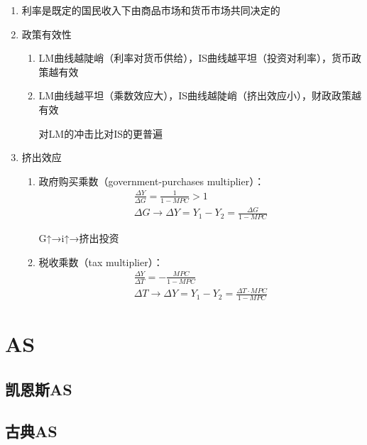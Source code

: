 \documentclass[12pt]{book}
\begin{document}
\begin{enumerate}[1.]
    \item 利率是既定的国民收入下由商品市场和货币市场共同决定的
    \item 政策有效性
          \begin{enumerate}[(1)]
              \item LM曲线越陡峭（利率对货币供给），IS曲线越平坦（投资对利率），货币政策越有效
              \item LM曲线越平坦（乘数效应大），IS曲线越陡峭（挤出效应小），财政政策越有效
                    \par 对LM的冲击比对IS的更普遍
          \end{enumerate}
    \item 挤出效应
          \begin{enumerate}[(1)]
              \item 政府购买乘数（government-purchases multiplier）：
                    \begin{gather*}
                        \frac{\Delta Y}{\Delta G}=\frac{1}{1-MPC}>1 \\
                        \Delta G\rightarrow \Delta Y=Y_1-Y_2=\frac{\Delta G}{1-MPC}
                    \end{gather*}
                    \par G↑→i↑→挤出投资
              \item 税收乘数（tax multiplier）：
                    \begin{gather*}
                        \frac{\Delta Y}{\Delta T}=-\frac{MPC}{1-MPC} \\
                        ΔT\rightarrow \Delta Y=Y_1-Y_2=\frac{\Delta T·MPC}{1-MPC}
                    \end{gather*}
          \end{enumerate}
\end{enumerate}




\section{AS}




\subsection{凯恩斯AS}


\subsection{古典AS}
\end{document}
